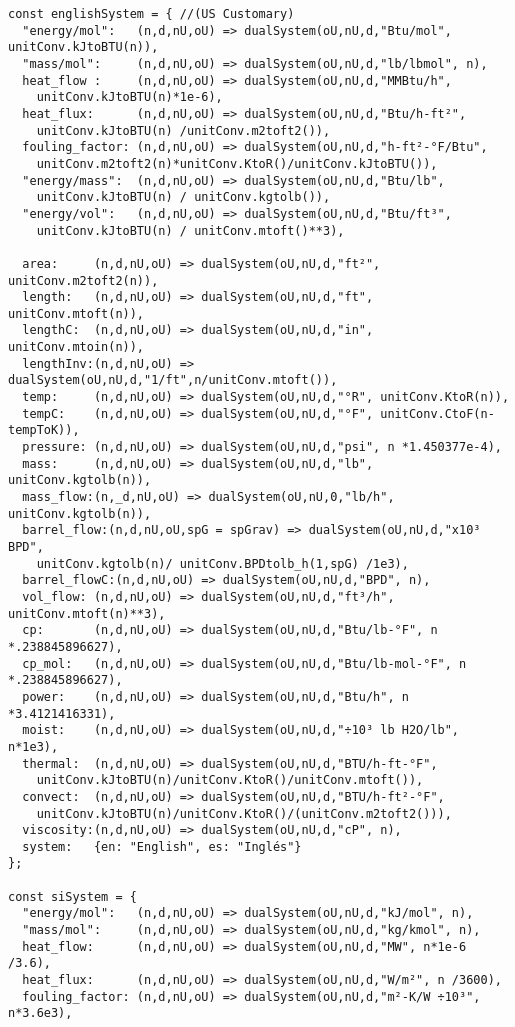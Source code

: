\begin{verbatim}
const englishSystem = { //(US Customary)
  "energy/mol":   (n,d,nU,oU) => dualSystem(oU,nU,d,"Btu/mol", unitConv.kJtoBTU(n)),
  "mass/mol":     (n,d,nU,oU) => dualSystem(oU,nU,d,"lb/lbmol", n),
  heat_flow :     (n,d,nU,oU) => dualSystem(oU,nU,d,"MMBtu/h", 
    unitConv.kJtoBTU(n)*1e-6),
  heat_flux:      (n,d,nU,oU) => dualSystem(oU,nU,d,"Btu/h-ft²",
    unitConv.kJtoBTU(n) /unitConv.m2toft2()),
  fouling_factor: (n,d,nU,oU) => dualSystem(oU,nU,d,"h-ft²-°F/Btu", 
    unitConv.m2toft2(n)*unitConv.KtoR()/unitConv.kJtoBTU()),
  "energy/mass":  (n,d,nU,oU) => dualSystem(oU,nU,d,"Btu/lb", 
    unitConv.kJtoBTU(n) / unitConv.kgtolb()),
  "energy/vol":   (n,d,nU,oU) => dualSystem(oU,nU,d,"Btu/ft³", 
    unitConv.kJtoBTU(n) / unitConv.mtoft()**3),

  area:     (n,d,nU,oU) => dualSystem(oU,nU,d,"ft²", unitConv.m2toft2(n)),
  length:   (n,d,nU,oU) => dualSystem(oU,nU,d,"ft", unitConv.mtoft(n)),
  lengthC:  (n,d,nU,oU) => dualSystem(oU,nU,d,"in", unitConv.mtoin(n)),
  lengthInv:(n,d,nU,oU) => dualSystem(oU,nU,d,"1/ft",n/unitConv.mtoft()),
  temp:     (n,d,nU,oU) => dualSystem(oU,nU,d,"°R", unitConv.KtoR(n)),
  tempC:    (n,d,nU,oU) => dualSystem(oU,nU,d,"°F", unitConv.CtoF(n-tempToK)),
  pressure: (n,d,nU,oU) => dualSystem(oU,nU,d,"psi", n *1.450377e-4),
  mass:     (n,d,nU,oU) => dualSystem(oU,nU,d,"lb", unitConv.kgtolb(n)),
  mass_flow:(n,_d,nU,oU) => dualSystem(oU,nU,0,"lb/h", unitConv.kgtolb(n)),
  barrel_flow:(n,d,nU,oU,spG = spGrav) => dualSystem(oU,nU,d,"x10³ BPD", 
    unitConv.kgtolb(n)/ unitConv.BPDtolb_h(1,spG) /1e3),  
  barrel_flowC:(n,d,nU,oU) => dualSystem(oU,nU,d,"BPD", n),
  vol_flow: (n,d,nU,oU) => dualSystem(oU,nU,d,"ft³/h", unitConv.mtoft(n)**3),
  cp:       (n,d,nU,oU) => dualSystem(oU,nU,d,"Btu/lb-°F", n *.238845896627),
  cp_mol:   (n,d,nU,oU) => dualSystem(oU,nU,d,"Btu/lb-mol-°F", n *.238845896627),
  power:    (n,d,nU,oU) => dualSystem(oU,nU,d,"Btu/h", n *3.4121416331),
  moist:    (n,d,nU,oU) => dualSystem(oU,nU,d,"÷10³ lb H2O/lb", n*1e3),
  thermal:  (n,d,nU,oU) => dualSystem(oU,nU,d,"BTU/h-ft-°F", 
    unitConv.kJtoBTU(n)/unitConv.KtoR()/unitConv.mtoft()),
  convect:  (n,d,nU,oU) => dualSystem(oU,nU,d,"BTU/h-ft²-°F", 
    unitConv.kJtoBTU(n)/unitConv.KtoR()/(unitConv.m2toft2())),
  viscosity:(n,d,nU,oU) => dualSystem(oU,nU,d,"cP", n),
  system:   {en: "English", es: "Inglés"}
};

const siSystem = {
  "energy/mol":   (n,d,nU,oU) => dualSystem(oU,nU,d,"kJ/mol", n),
  "mass/mol":     (n,d,nU,oU) => dualSystem(oU,nU,d,"kg/kmol", n),
  heat_flow:      (n,d,nU,oU) => dualSystem(oU,nU,d,"MW", n*1e-6 /3.6),
  heat_flux:      (n,d,nU,oU) => dualSystem(oU,nU,d,"W/m²", n /3600),
  fouling_factor: (n,d,nU,oU) => dualSystem(oU,nU,d,"m²-K/W ÷10³", n*3.6e3),


\end{verbatim}
